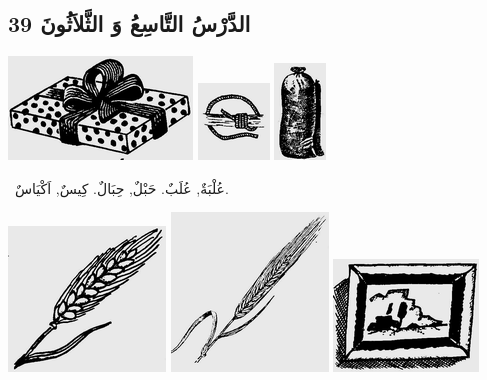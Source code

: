 \documentclass[a5paper]{article}
\begin{document}
\subsection[الدَّرْسُ التَّاسِعُ وَ الثَّلاَثُونَ 39]{الدَّرْسُ التَّاسِعُ وَ الثَّلاَثُونَ 39}
 \includegraphics[width=1.9272in,height=1.0835in]{MuhammadBagauddinlatinized-img102.png}   \includegraphics[width=0.75in,height=0.802in]{MuhammadBagauddinlatinized-img103.png}   \includegraphics[width=0.5417in,height=1.0102in]{MuhammadBagauddinlatinized-img104.png}  

\ عُلْبَةٌ, عُلَبٌ. حَبْلٌ, حِبَالٌ. كِيسٌ, اَكْيَاسٌ. 

 \includegraphics[width=1.6457in,height=1.5209in]{MuhammadBagauddinlatinized-img105.png}  \includegraphics[width=1.6457in,height=1.6665in]{MuhammadBagauddinlatinized-img106.png}   \includegraphics[width=1.5209in,height=1.1772in]{MuhammadBagauddinlatinized-img107.png} 
\end{document}
